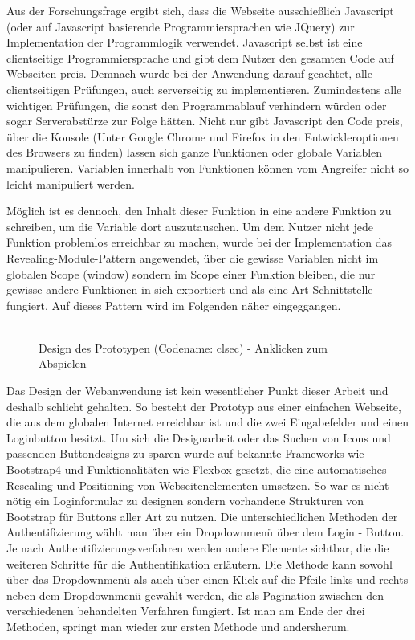\begin{enumerate}
Aus der Forschungsfrage ergibt sich, dass die Webseite ausschießlich Javascript (oder auf Javascript basierende Programmiersprachen wie JQuery) zur Implementation der Programmlogik verwendet. Javascript selbst ist eine clientseitige Programmiersprache und gibt dem Nutzer den gesamten Code auf Webseiten preis. Demnach wurde bei der Anwendung darauf geachtet, alle clientseitigen Prüfungen, auch serverseitig zu implementieren. Zumindestens alle wichtigen Prüfungen, die sonst den Programmablauf verhindern würden oder sogar Serverabstürze zur Folge hätten. Nicht nur gibt Javascript den Code preis, über die Konsole (Unter Google Chrome und Firefox in den Entwickleroptionen des Browsers zu finden) lassen sich ganze Funktionen oder globale Variablen manipulieren. Variablen innerhalb von Funktionen können vom Angreifer nicht so leicht manipuliert werden.

Möglich ist es dennoch, den Inhalt dieser Funktion in eine andere Funktion zu schreiben, um die Variable dort auszutauschen. Um dem Nutzer nicht jede Funktion problemlos erreichbar zu machen, wurde bei der Implementation das Revealing-Module-Pattern angewendet, über die gewisse Variablen nicht im globalen Scope (window) sondern im Scope einer Funktion bleiben, die nur gewisse andere Funktionen in sich exportiert und als eine Art Schnittstelle fungiert. Auf dieses Pattern wird im Folgenden näher eingeggangen. \\\\

\begin{figure}[ht]
	\centering
	\caption[Design des Prototypen (Codename: clsec)]{Design des Prototypen (Codename: clsec) - Anklicken zum Abspielen}
	\label{fig:webapp_design}
\end{figure}
\newpage

Das Design der Webanwendung ist kein wesentlicher Punkt dieser Arbeit und deshalb schlicht gehalten. So besteht der Prototyp aus einer einfachen Webseite, die aus dem globalen Internet erreichbar ist und die zwei Eingabefelder und einen Loginbutton besitzt. Um sich die Designarbeit oder das Suchen von Icons und passenden Buttondesigns zu sparen wurde auf bekannte Frameworks wie Bootstrap4 und Funktionalitäten wie Flexbox gesetzt, die eine automatisches Rescaling und Positioning von Webseitenelementen umsetzen. So war es nicht nötig ein Loginformular zu designen sondern vorhandene Strukturen von Bootstrap für Buttons aller Art zu nutzen. Die unterschiedlichen Methoden der Authentifizierung wählt man über ein Dropdownmenü über dem Login - Button. Je nach Authentifizierungsverfahren werden andere Elemente sichtbar, die die weiteren Schritte für die Authentifikation erläutern. Die Methode kann sowohl über das Dropdownmenü als auch über einen Klick auf die Pfeile links und rechts neben dem Dropdownmenü gewählt werden, die als Pagination zwischen den verschiedenen behandelten Verfahren fungiert. Ist man am Ende der drei Methoden, springt man wieder zur ersten Methode und andersherum.


\end{enumerate}
